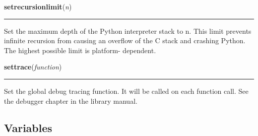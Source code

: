     \vspace{0.5ex}

\hspace{.8\funcindent}\begin{boxedminipage}{\funcwidth}

    \raggedright \textbf{setrecursionlimit}(\textit{n})

    \vspace{-1.5ex}

    \rule{\textwidth}{0.5\fboxrule}
\setlength{\parskip}{2ex}
    Set the maximum depth of the Python interpreter stack to n.  This limit
    prevents infinite recursion from causing an overflow of the C stack and
    crashing Python.  The highest possible limit is platform- dependent.

\setlength{\parskip}{1ex}
    \end{boxedminipage}

    \label{sys:settrace}

    \vspace{0.5ex}

\hspace{.8\funcindent}\begin{boxedminipage}{\funcwidth}

    \raggedright \textbf{settrace}(\textit{function})

    \vspace{-1.5ex}

    \rule{\textwidth}{0.5\fboxrule}
\setlength{\parskip}{2ex}
    Set the global debug tracing function.  It will be called on each 
    function call.  See the debugger chapter in the library manual.

\setlength{\parskip}{1ex}
    \end{boxedminipage}



  \subsection{Variables}

